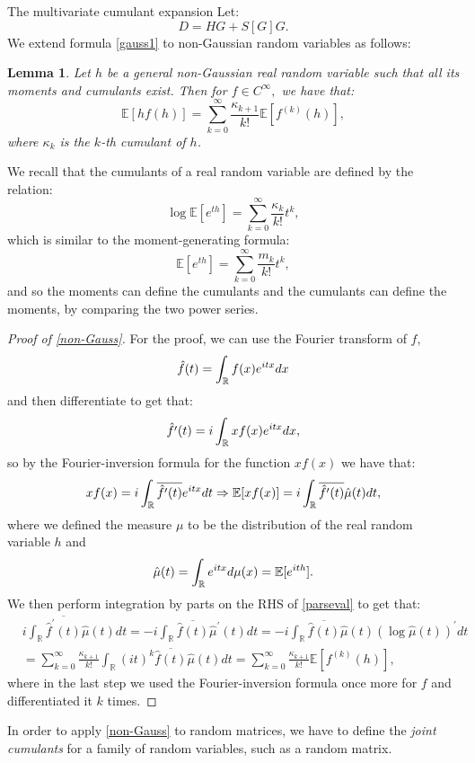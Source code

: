 \documentclass[11pt, a4paper, oneside]{book}
\numberwithin{equation}{chapter}
\newcommand{\E}{\mathbb E}
\newcommand{\beq}{\begin{equation}}
\newcommand{\eeq}{\end{equation}}
\newtheorem{lem}[thm]{Lemma}
\begin{document}
\begin{section}{The multivariate cumulant expansion}
Let: 
\beq \label{D-error}
D = HG + S[G]G .
\eeq 
%
We extend formula \eqref{gauss1} to non-Gaussian random variables as follows:
%
\pagebreak
%
\begin{lem} Let $h$ be a general non-Gaussian real random variable such that all its moments and cumulants exist. Then for $f\in C^\infty,$ we have that:
\beq \label{non-Gauss}
\E[hf(h)] = \sum \limits_{k=0}^\infty \frac{\kappa_{k+1}}{k!} \E [f^{(k)}(h)],
\eeq
%
where $\kappa_{k}$ is the $k$-th cumulant of $h$.
\end{lem}
%
We recall that the cumulants of a real random variable are defined by the relation:
\beq \label{cumulant}
\log \E [e^{th}] = \sum \limits_{k=0}^\infty \frac{\kappa_k}{k!}t^k ,
\eeq
which is similar to the moment-generating formula:
\beq \label{moment}
\E [e^{th}] = \sum \limits_{k=0}^\infty \frac{m_k}{k!}t^k ,
\eeq
and so the moments can define the cumulants and the cumulants can define the moments, by comparing the two power series.
%
\begin{proof}[Proof of \eqref{non-Gauss}]
    For the proof, we can use the Fourier transform of $f$,
    \[
    \Hat{f}(t) = \int_{\mathbb{R}} f(x) e^{itx} dx
    \]
    and then differentiate to get that:
    \[
    \Hat{f'}(t) = i \int_{\mathbb{R}} xf(x) e^{itx}dx,
    \]
    so by the Fourier-inversion formula for the function $xf(x)$ we have that:
    \beq \label{parseval}
    xf(x) = i \int_{\mathbb{R}} \overline{\Hat{f'}(t) } e^{itx} dt \Rightarrow \E[xf(x)] = i \int_{\mathbb{R}} \overline{\Hat{f'}(t) } \Hat{\mu}(t) dt,
    \eeq 
    where we defined the measure $\mu$ to be the distribution of the real random variable $h$ and
    \[
    \Hat{\mu}(t) = \int_{\mathbb{R}} e^{itx} d \mu(x) = \E[e^{ith}] .
    \]
    We then perform integration by parts on the RHS of \eqref{parseval} to get that:
    \begin{align*} \label{parseval2}
    &i \int_{\mathbb{R}} \overline{\hat{f}^{\prime}(t)} \hat{\mu}(t) d t  =-i \int_{\mathbb{R}} \overline{\hat{f}(t)} \hat{\mu}^{\prime}(t) dt =-i \int_{\mathbb{R}} \overline{\hat{f}(t)} \hat{\mu}(t)(\log \hat{\mu}(t))^{\prime} dt \\
    &=\sum_{k=0}^{\infty} \frac{\kappa_{k+1}}{k!} \int_{\mathbb{R}}(i t)^k \overline{\hat{f}(t)} \hat{\mu}(t) d t=\sum_{k=0}^{\infty} \frac{\kappa_{k+1}}{k!} \mathbb{E} [f^{(k)}(h) ] ,
    \end{align*}
    where in the last step we used the Fourier-inversion formula once more for $f$ and differentiated it $k$ times.
\end{proof}
%
In order to apply \eqref{non-Gauss} to random matrices, we have to define the \textit{joint cumulants} for a family of random variables, such as a random matrix.


\end{section}
\end{document}
